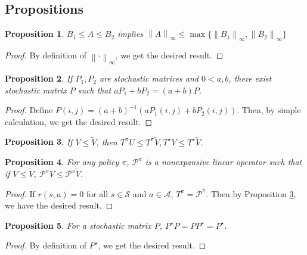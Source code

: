 \documentclass{article} %
\newcommand{\cA}{\mathcal{A}}
\newcommand{\cS}{\mathcal{S}}
\newcommand{\cP}{\mathcal{P}}
\newcommand*{\infn}[1]{\left\|{#1}\right\|_{\infty}}
\newtheorem{proposition}{Proposition}
\begin{document}
\subsection{Propositions}
\begin{proposition}\label{prop::inf_norm}
$B_1 \le A \le B_2$ implies $ \infn{A} \le \max \{ \infn{B_1}, \infn{B_2}\}$    
\end{proposition}
\begin{proof}
    By definition of $\infn{\cdot}$, we get the desired result.
\end{proof}
\begin{proposition}
If $P_1, P_2$ are stochastic matrices and $0 < a,b$, there exist stochastic matrix $P$ such that $aP_1+bP_2 = (a+b)P$.     
\end{proposition}
\begin{proof}
    Define $P(i,j) = (a+b)^{-1} (aP_1(i,j)+bP_2(i,j)) $. Then, by simple calculation, we get the desired result.
\end{proof}
\begin{proposition}\label{prop::monotonicity}{} If $V\le \tilde{V}$, then $T^{\pi} U\le T^{\pi}\tilde{V}, T^{\star}V \le T^{\star}\tilde{V}$.
\end{proposition}

\begin{proposition}\label{prop::nonexp_prob_kernel}
  For any policy $\pi$, $\cP^{\pi}$ is a nonexpansive linear operator such that if $V \le \tilde{V}$, $\cP^{\pi} V\le \cP^{\pi}\tilde{V}$.
\end{proposition}
\begin{proof} If $r(s,a)=0$ for all $s \in \cS$ and $a \in \cA$, $T^{\pi}=\cP^{\pi}$. Then by Proposition \ref{prop::monotonicity}, we have the desired result.  

\end{proof}

\begin{proposition}\label{prop::Cesaro}
For a stochastic matrix $P$, $P^{\star}P=PP^{\star}=P^{\star}$. 
\end{proposition}
\begin{proof}
    By definition of $P^{\star}$, we get the desired result. 
\end{proof}
\end{document}
